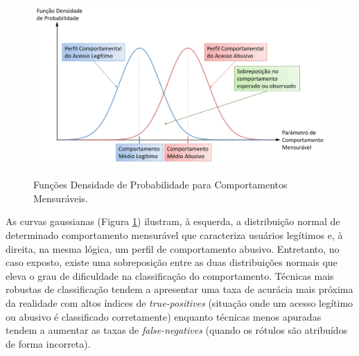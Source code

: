 \begin{figure}
\centering
\caption{Funções Densidade de Probabilidade para Comportamentos Mensuráveis.} \includegraphics[width=12cm,height=\textwidth,keepaspectratio]{figs/funcao_densidade_probabilidade.png}
\newline {}\label{fig:pdf}
\end{figure}

As curvas gaussianas (Figura \ref{fig:pdf}) ilustram, à esquerda, a distribuição normal de determinado comportamento mensurável que caracteriza usuários legítimos e, à direita, na mesma lógica, um perfil de comportamento abusivo. Entretanto, no caso exposto, existe uma sobreposição entre as duas distribuições normais que eleva o grau de dificuldade na classificação do comportamento. Técnicas mais robustas de classificação tendem a apresentar uma taxa de acurácia mais próxima da realidade com altos índices de \textit{true-positives} (situação onde um acesso legítimo ou abusivo é classificado corretamente) enquanto técnicas menos apuradas tendem a aumentar as taxas de \textit{false-negatives} (quando os rótulos são atribuídos de forma incorreta). 

